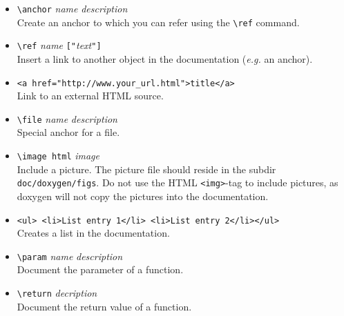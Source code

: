 \documentclass[
a4paper,                        %
11pt,                           %
twoside,                        %
footsepline,                    %
headsepline,                    %
headexclude,                    %
footexclude,                    %
pagesize,                       %
bibtotocnumbered,               %
idxtotoc                        %
]{scrartcl}
\newcommand{\eg}{\textit{e.g.}\xspace}
\begin{document}
\begin{itemize}
\item \verb!\anchor! \textit{name} \textit{description}\\
  Create an anchor to which you can refer using the \verb!\ref!
  command.
\item \verb!\ref! \textit{name} \texttt{["}\textit{text}\texttt{"]}\\
  Insert a link to another object in the documentation (\eg an
  anchor).
\item \verb!<a href="http://www.your_url.html">title</a>!\\
  Link to an external HTML source.
\item \verb!\file! \textit{name} \textit{description}\\
  Special anchor for a file.
\item \verb!\image html! \textit{image}\\
  Include a picture. The picture file should reside in the subdir
  \verb!doc/doxygen/figs!. Do not use the HTML \verb!<img>!-tag to
  include pictures, as doxygen will not copy the pictures into the
  documentation.
\item \verb!<ul> <li>List entry 1</li> <li>List entry 2</li></ul>!\\
  Creates a list in the documentation.
\item \verb!\param! \textit{name} \textit{description}\\
  Document the parameter of a function.
\item \verb!\return! \textit{decription}\\
  Document the return value of a function.
\end{itemize}

\printindex
\end{document}
